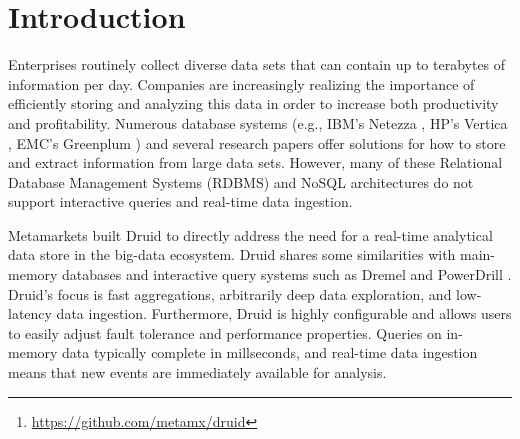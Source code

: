 \documentclass{vldb}
\begin{document}
\maketitle

\begin{abstract}
Druid is an open source\footnote{\href{https://github.com/metamx/druid}{https://github.com/metamx/druid}}, real-time analytical data store that supports
fast ad-hoc queries on large-scale data sets. The system combines a
column-oriented data layout, a shared-nothing architecture, and an advanced
indexing structure to allow for the arbitrary exploration of billion-row
tables with sub-second latencies. Druid scales horizontally and is the
core engine of the Metamarkets data analytics platform. In this paper, we detail Druid's architecture, and describe how it supports real-time data ingestion and interactive analytical queries. 
\end{abstract}

\section{Introduction}
Enterprises routinely collect diverse data sets that can contain up to terabytes of information per day. Companies are increasingly realizing the importance of efficiently storing and analyzing this data in order to increase both productivity and profitability. Numerous database systems (e.g., IBM’s Netezza \cite{singh2011introduction}, HP's Vertica \cite{bear2012vertica}, EMC’s Greenplum \cite{miner2012unified}) and several research papers \cite{barroso2009datacenter, chaudhuri1997overview, dewitt1992parallel} offer solutions for how to store and extract information from large data sets. However, many of these Relational Database Management Systems (RDBMS) and NoSQL architectures do not support interactive queries and real-time data ingestion.

Metamarkets built Druid to directly address the need for a real-time analytical data store in the big-data ecosystem. Druid shares some similarities with main-memory databases \cite{farber2012sap} and interactive query systems such as Dremel \cite{melnik2010dremel} and PowerDrill \cite{hall2012processing}. Druid's focus is fast aggregations, arbitrarily deep data exploration, and low-latency data ingestion. Furthermore, Druid is highly configurable and allows users to easily adjust fault tolerance and performance properties. Queries on in-memory data typically complete in millseconds, and real-time data ingestion means that new events are immediately available for analysis.
\end{document}
